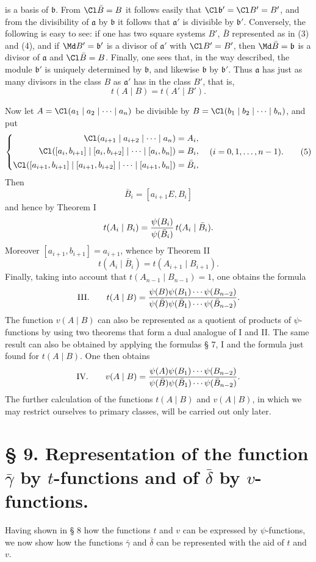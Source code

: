 is a basis of $\mathfrak b$. From $\Cl\bar B=B$ it follows easily that $\Cl\mathfrak b'=\Cl B'=B'$, and from the divisibility of $\mathfrak a$ by $\mathfrak b$ it follows that $\mathfrak a'$ is divisible by $\mathfrak b'$. Conversely, the following is easy to see: if one has two square systems $B'$, $\bar B$ represented as in (3) and (4), and if $\Md B'=\mathfrak b'$ is a divisor of $\mathfrak a'$ with $\Cl B'=B'$, then $\Md\bar B=\mathfrak b$ is a divisor of $\mathfrak a$ and $\Cl\bar B=B$. Finally, one sees that, in the way described, the module $\mathfrak b'$ is uniquely determined by $\mathfrak b$, and likewise $\mathfrak b$ by $\mathfrak b'$. Thus $\mathfrak a$ has just as many divisors in the class $B$ as $\mathfrak a'$ has in the class $B'$, that is,
\[
 t(A\mid B)=t(A'\mid B').
\]

Now let $A=\Cl(a_1\mid a_2\mid\cdots\mid a_n)$ be divisible by $B=\Cl(b_1\mid b_2\mid\cdots\mid b_n)$, and put
\begin{equation}
\left\{
\begin{aligned}
 \Cl(a_{i+1}\mid a_{i+2}\mid\cdots\mid a_n)&=A_i,\\
 \Cl([a_i,b_{i+1}]\mid[a_i,b_{i+2}]\mid\cdots\mid[a_i,b_n])&=B_i,\\
 \Cl([a_{i+1},b_{i+1}]\mid[a_{i+1},b_{i+2}]\mid\cdots\mid[a_{i+1},b_n])&=\bar B_i,
\end{aligned}
\right.
\quad (i=0,1,\ldots,n-1).
\tag{5}
\end{equation}
Then
\[
 \bar B_i=[a_{i+1}E,B_i]
\]
and hence by Theorem I
\[
 t(A_i\mid B_i)={\psi(B_i)\over\psi(\bar B_i)}\,t(A_i\mid\bar B_i).
\]
Moreover $[a_{i+1},b_{i+1}]=a_{i+1}$, whence by Theorem II
\[
 t(A_i\mid\bar B_i)=t(A_{i+1}\mid B_{i+1}).
\]
Finally, taking into account that $t(A_{n-1}\mid B_{n-1})=1$, one obtains the formula
\[
\text{III.}\qquad
 t(A\mid B)=
 {\psi(B)\psi(B_1)\cdots\psi(B_{n-2})
 \over
 \psi(\bar B)\psi(\bar B_1)\cdots\psi(\bar B_{n-2})}.
\]
The function $v(A\mid B)$ can also be represented as a quotient of products of $\psi$-functions by using two theorems that form a dual analogue of I and II. The same result can also be obtained by applying the formulas § 7, I and the formula just found for $t(A\mid B)$. One then obtains
\[
\text{IV.}\qquad
 v(A\mid B)=
 {\psi(A)\psi(B_1)\cdots\psi(B_{n-2})
 \over
 \psi(\bar B)\psi(\bar B_1)\cdots\psi(\bar B_{n-2})}.
\]
The further calculation of the functions $t(A\mid B)$ and $v(A\mid B)$, in which we may restrict ourselves to primary classes, will be carried out only later.

\section*{§ 9. Representation of the function $\bar\gamma$ by $t$-functions and of $\bar\delta$ by $v$-functions.}

Having shown in § 8 how the functions $t$ and $v$ can be expressed by $\psi$-functions, we now show how the functions $\bar\gamma$ and $\bar\delta$ can be represented with the aid of $t$ and $v$.
